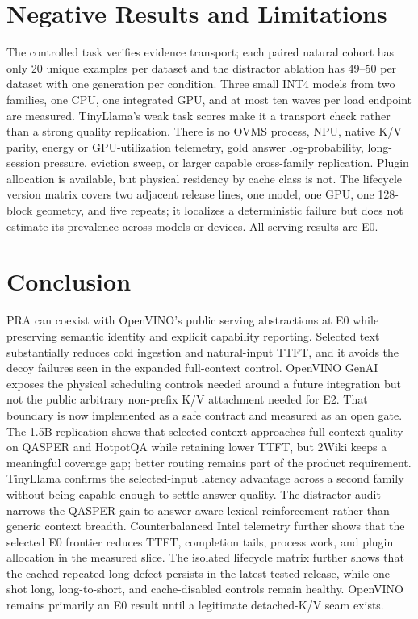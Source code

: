 \documentclass[10pt]{article}
\begin{document}
\section{Negative Results and Limitations}
The controlled task verifies evidence transport; each paired natural cohort
has only 20 unique examples per dataset and the distractor ablation has 49--50
per dataset with one generation per condition. Three small INT4 models from
two families, one CPU, one integrated GPU, and at most ten waves per load
endpoint are measured. TinyLlama's weak task scores make it a transport check
rather than a strong quality replication.
There is no OVMS process, NPU, native K/V parity, energy or GPU-utilization
telemetry, gold answer log-probability, long-session pressure, eviction sweep,
or larger capable cross-family replication. Plugin allocation is available, but
physical residency by cache class is not.
The lifecycle version matrix covers two adjacent release lines, one model,
one GPU, one 128-block geometry, and five repeats; it localizes a deterministic
failure but does not estimate its prevalence across models or devices.
All serving results are E0.

\section{Conclusion}
PRA can coexist with OpenVINO's public serving abstractions at E0 while
preserving semantic identity and explicit capability reporting. Selected text
substantially reduces cold ingestion and natural-input TTFT, and it avoids the
decoy failures seen in the expanded full-context control. OpenVINO GenAI exposes the
physical scheduling controls needed around a future integration but not the
public arbitrary non-prefix K/V attachment needed for E2. That boundary is now
implemented as a safe contract and measured as an open gate. The 1.5B
replication shows that selected context approaches full-context quality on
QASPER and HotpotQA while retaining lower TTFT, but 2Wiki keeps a meaningful
coverage gap; better routing remains part of the product requirement.
TinyLlama confirms the selected-input latency advantage across a second family
without being capable enough to settle answer quality. The distractor audit
narrows the QASPER gain to answer-aware lexical reinforcement rather than
generic context breadth. Counterbalanced Intel telemetry further shows that the
selected E0 frontier reduces TTFT, completion tails, process work, and plugin
allocation in the measured slice. The isolated lifecycle matrix further shows
that the cached repeated-long defect persists in the latest tested release,
while one-shot long, long-to-short, and cache-disabled controls remain healthy.
OpenVINO remains primarily an E0 result until
a legitimate detached-K/V seam exists.
\end{document}
